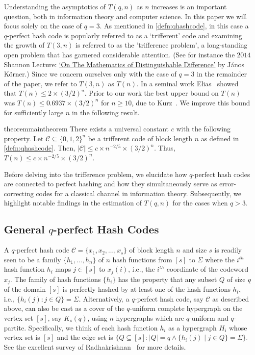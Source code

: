 \documentclass[10pt,a4paper]{article}
\newcommand{\qklhashcode}{$q$-perfect hash code}
\newcommand{\calC}{\mathcal{C}}
\newcommand{\set}[1]{\{#1\}}
\DeclareMathOperator{\1}{\mathbf{1}}
\begin{document}
Understanding the asymptotics of $T(q,n)$ as $n$ increases is an important question, both in information theory and computer science. 
In this paper we will focus solely on the case of $q=3$.
As mentioned in \cref{defn:qhashcode}, in this case a \qklhashcode{}  is popularly referred to as a `trifferent' code and examining the growth of $T(3,n)$ is referred to as the 'trifference problem', a long-standing open problem that has garnered considerable attention.
(See for instance the $2014$ Shannon Lecture: \href{https://www.itsoc.org/video/isit-2014-mathematics-distinguishable-difference}{`On The Mathematics of Distinguishable Difference'} by János Körner.)
Since we concern ourselves only with the case of $q=3$ in the remainder of the paper, we refer to $T(3,n)$ as $T(n)$. In a seminal work Elias~\cite{Elias1988} showed that $T(n)\leq {2\times (3/2)^n}$.
Prior to our work the best upper bound on $T(n)$ was $T(n)\leq 0.6937 \times (3/2)^n$ for $n\geq 10$, due to Kurz~\cite{Kurz2023trifferent}. We improve this bound for sufficiently large $n$ in the following result.
\begin{restatable}{theorem}{maintheorem}
	\label{thm:main_thm}
	There exists a universal constant $c$ with the following property.
	Let  $\calC\subseteq \set{0,1,2}^n$ be a trifferent code of block length $n$ as defined in \cref{defn:qhashcode}.
	Then, $|\calC| \leq c \times n^{-2/5}\times (3/2)^n$.
	Thus, $T(n)\leq c \times n^{-2/5}\times (3/2)^n$.
\end{restatable}


Before delving into the trifference problem, we elucidate how \qklhashcode{s} are connected to perfect hashing and how they simultaneously serve as error-correcting codes for a classical channel in information theory. Subsequently, we highlight notable findings in the estimation of $T(q,n)$ for the cases when $q>3$.

\subsection*{General $q$-perfect Hash Codes}
A \qklhashcode{} $\calC = \set{x_{1},x_{2},\ldots,x_{s}}$ of block length $n$ and size $s$ is readily seen to be a family $\set{h_1, \ldots, h_n}$ of $n$ hash functions from  $[s]$ to $\Sigma$ where the $i^{th}$ hash function $h_i$ maps $j\in [s]$ to $x_j(i)$, i.e., the $i^{th}$ coordinate of the codeword $x_j$.
The family of hash functions $\set{h_i}$ has the property that any subset $Q$ of size $q$ of the domain $[s]$  is perfectly hashed by at least one of the hash functions $h_i$, i.e., $\set{h_i(j)\colon j\in Q} = \Sigma$.
Alternatively, a \qklhashcode{}, say $\calC$ as described above, can also be cast as a cover of the $q$-uniform complete hypergraph on the vertex set $[s]$, say $K_s(q)$,  using $n$ hypergraphs which are $q$-uniform and $q$-partite.
Specifically, we think of each hash function $h_i$ as a hypergraph $H_i$ whose vertex set is $[s]$ and the edge set is $\set{Q\subseteq [s] : |Q|=q \land \set{h_i(j) \mid j\in Q} = \Sigma}$. See the excellent survey of Radhakrishnan~\cite{Radhakrishnan2001EntropyAC} for more details.
\end{document}
